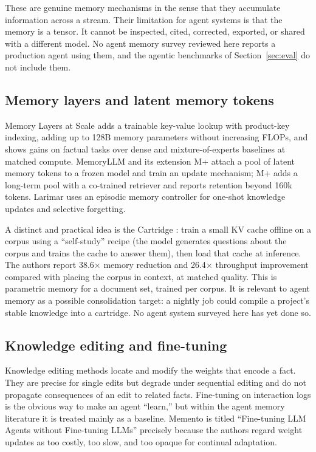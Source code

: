 \documentclass[11pt]{article}
\begin{document}
These are genuine memory mechanisms in the sense that they accumulate information across a stream. Their limitation for agent systems is that the memory is a tensor. It cannot be inspected, cited, corrected, exported, or shared with a different model. No agent memory survey reviewed here reports a production agent using them, and the agentic benchmarks of Section~\ref{sec:eval} do not include them.

\subsection{Memory layers and latent memory tokens}

Memory Layers at Scale \citep{berges2024memorylayers} adds a trainable key-value lookup with product-key indexing, adding up to 128B memory parameters without increasing FLOPs, and shows gains on factual tasks over dense and mixture-of-experts baselines at matched compute. MemoryLLM \citep{wang2024memoryllm} and its extension M+ \citep{wang2025mplus} attach a pool of latent memory tokens to a frozen model and train an update mechanism; M+ adds a long-term pool with a co-trained retriever and reports retention beyond 160k tokens. Larimar \citep{das2024larimar} uses an episodic memory controller for one-shot knowledge updates and selective forgetting.

A distinct and practical idea is the Cartridge \citep{eyuboglu2025cartridges}: train a small KV cache offline on a corpus using a ``self-study'' recipe (the model generates questions about the corpus and trains the cache to answer them), then load that cache at inference. The authors report 38.6$\times$ memory reduction and 26.4$\times$ throughput improvement compared with placing the corpus in context, at matched quality. This is parametric memory for a document set, trained per corpus. It is relevant to agent memory as a possible consolidation target: a nightly job could compile a project's stable knowledge into a cartridge. No agent system surveyed here has yet done so.

\subsection{Knowledge editing and fine-tuning}

Knowledge editing methods \citep{meng2022rome,meng2023memit} locate and modify the weights that encode a fact. They are precise for single edits but degrade under sequential editing \citep{gupta2024editing} and do not propagate consequences of an edit to related facts. Fine-tuning on interaction logs is the obvious way to make an agent ``learn,'' but within the agent memory literature it is treated mainly as a baseline. Memento \citep{zhou2025memento} is titled ``Fine-tuning LLM Agents without Fine-tuning LLMs'' precisely because the authors regard weight updates as too costly, too slow, and too opaque for continual adaptation.
\end{document}
